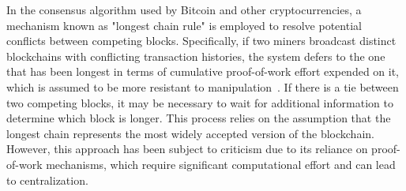 In the consensus algorithm used by Bitcoin and other cryptocurrencies, a mechanism known as "longest chain rule" is employed to resolve
potential conflicts between competing blocks. Specifically, if two miners broadcast distinct blockchains with conflicting transaction
histories, the system defers to the one that has been longest in terms of cumulative proof-of-work effort expended on it, which is
assumed to be more resistant to manipulation~\cite{buterin2014next}. If there is a tie between two competing blocks, it may be necessary
to wait for additional information to determine which block is longer. This process relies on the assumption that the longest chain
represents the most widely accepted version of the blockchain. However, this approach has been subject to criticism due to its reliance
on proof-of-work mechanisms, which require significant computational effort and can lead to centralization.
